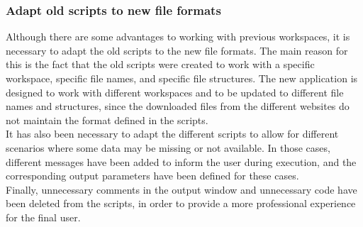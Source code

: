 \subsubsection{Adapt old scripts to new file formats}
{Although there are some advantages to working with previous workspaces, it is necessary to adapt the old scripts to the new file formats. The main reason for this is the fact that the old scripts were created to work with a specific workspace, specific file names, and specific file structures. The new application is designed to work with different workspaces and to be updated to different file names and structures, since the downloaded files from the different websites do not maintain the format defined in the scripts.
\smallskip\\It has also been necessary to adapt the different scripts to allow for different scenarios where some data may be missing or not available. In those cases, different messages have been added to inform the user during execution, and the corresponding output parameters have been defined for these cases.
\smallskip\\Finally, unnecessary comments in the output window and unnecessary code have been deleted from the scripts, in order to provide a more professional experience for the final user.}
\bigskip